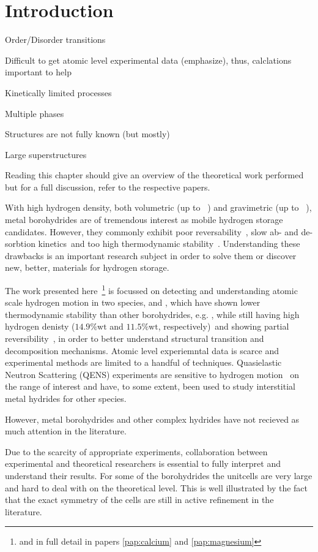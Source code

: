 \section{Introduction}
\label{sec:borohydrides-introduction}

\bit
\item Order/Disorder transitions
\item Difficult to get atomic level experimental data (emphasize), thus, calclations important to help
\item Kinetically limited processes
\item Multiple phases
\item Structures are not fully known (but mostly)
\item Large superstructures
\item Reading this chapter should give an overview of the theoretical work performed but for a full discussion, refer to the respective papers.
\eit

With high hydrogen density, both volumetric (up to \missing{}~\citemiss) and gravimetric (up to \missing{}~\citemiss), metal borohydrides are of tremendous interest as mobile hydrogen storage candidates.
However, they commonly exhibit poor reversability~\citemiss, slow ab- and de-sorbtion kinetics~\citemiss and too high thermodynamic stability~\citemiss.
Understanding these drawbacks is an important research subject in order to solve them or discover new, better, materials for hydrogen storage.

The work presented here~\footnote{and in full detail in papers \ref{pap:calcium} and \ref{pap:magnesium}} is focussed on detecting and understanding atomic scale hydrogen motion in two species,  and , which have shown lower thermodynamic stability than other borohydrides, e.g. , while still having high hydrogen denisty ($14.9\%\text{wt}$ and $11.5\%\text{wt}$, respectively)~\citemiss and showing partial reversibility~\citemiss, in order to better understand structural transition and decomposition mechanisms.
Atomic level experiemntal data is scarce and experimental methods are limited to a handful of techniques.
Quasielastic Neutron Scattering (QENS) experiments are sensitive to hydrogen motion~\cite{qens-bee-1988} on the range of interest and have, to some extent, been used to study interstitial metal hydrides for other species.~\citmiss

However, metal borohydrides and other complex hydrides have not recieved as much attention in the literature.
\expand

Due to the scarcity of appropriate experiments, collaboration between experimental and theoretical researchers is essential to fully interpret and understand their results.
For some of the borohydrides the unitcells are very large and hard to deal with on the theoretical level.
This is well illustrated by the fact that the exact symmetry of the cells are still in active refinement in the literature.~\citemiss
\expand

